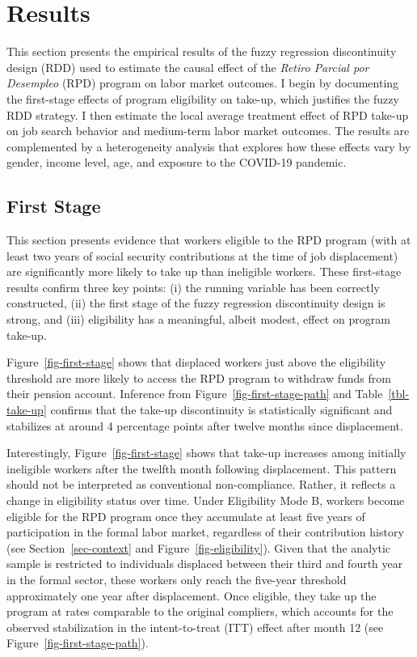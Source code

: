 \documentclass[
  4pt,
]{report}
\begin{document}
\chapter{Results}\label{sec-results}

This section presents the empirical results of the fuzzy regression
discontinuity design (RDD) used to estimate the causal effect of the
\emph{Retiro Parcial por Desempleo} (RPD) program on labor market
outcomes. I begin by documenting the first-stage effects of program
eligibility on take-up, which justifies the fuzzy RDD strategy. I then
estimate the local average treatment effect of RPD take-up on job search
behavior and medium-term labor market outcomes. The results are
complemented by a heterogeneity analysis that explores how these effects
vary by gender, income level, age, and exposure to the COVID-19
pandemic.

\section{First Stage}\label{sec-take-up}

This section presents evidence that workers eligible to the RPD program
(with at least two years of social security contributions at the time of
job displacement) are significantly more likely to take up than
ineligible workers. These first-stage results confirm three key points:
(i) the running variable has been correctly constructed, (ii) the first
stage of the fuzzy regression discontinuity design is strong, and (iii)
eligibility has a meaningful, albeit modest, effect on program take-up.

Figure~\ref{fig-first-stage} shows that displaced workers just above the
eligibility threshold are more likely to access the RPD program to
withdraw funds from their pension account. Inference from
Figure~\ref{fig-first-stage-path} and Table~\ref{tbl-take-up} confirms
that the take-up discontinuity is statistically significant and
stabilizes at around 4 percentage points after twelve months since
displacement.

Interestingly, Figure~\ref{fig-first-stage} shows that take-up increases
among initially ineligible workers after the twelfth month following
displacement. This pattern should not be interpreted as conventional
non-compliance. Rather, it reflects a change in eligibility status over
time. Under Eligibility Mode B, workers become eligible for the RPD
program once they accumulate at least five years of participation in the
formal labor market, regardless of their contribution history (see
Section~\ref{sec-context} and Figure~\ref{fig-eligibility}). Given that
the analytic sample is restricted to individuals displaced between their
third and fourth year in the formal sector, these workers only reach the
five-year threshold approximately one year after displacement. Once
eligible, they take up the program at rates comparable to the original
compliers, which accounts for the observed stabilization in the
intent-to-treat (ITT) effect after month 12 (see
Figure~\ref{fig-first-stage-path}).
\end{document}
